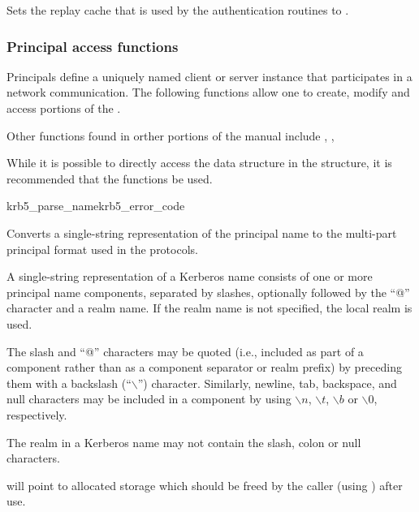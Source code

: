 Sets the replay cache that is used by the authentication routines to .


\subsubsection{Principal access functions}

Principals define a uniquely named client or server instance that
participates in a network communication. The following functions allow
one to create, modify and access portions of the
. 

Other functions found in orther portions of the manual include
, , 

While it is possible to directly access the data structure in the
structure, it is recommended that the functions be used. 

\begin{funcdecl}{krb5_parse_name}{krb5_error_code}{\funcinout}
\funcin
{}
\funcout
{}
\end{funcdecl}

Converts a single-string representation  of the
principal name to the multi-part principal format used in the protocols.

A single-string representation of a Kerberos name consists of one or
more principal name components, separated by slashes, optionally
followed by the ``@'' character and a realm name.  If the realm name
is not specified, the local realm is used.

The slash and ``@'' characters may be quoted (i.e., included as part
of a component rather than as a component separator or realm prefix)
by preceding them with a backslash (``$\backslash$'') character.
Similarly, newline, tab, backspace, and null characters may be
included in a component by using $\backslash{}n$, $\backslash{}t$,
$\backslash{}b$ or $\backslash{}0$, respectively.

The realm in a Kerberos name may not contain the slash, colon or null
characters.

 will point to allocated storage which should be freed by
the caller (using ) after use.

